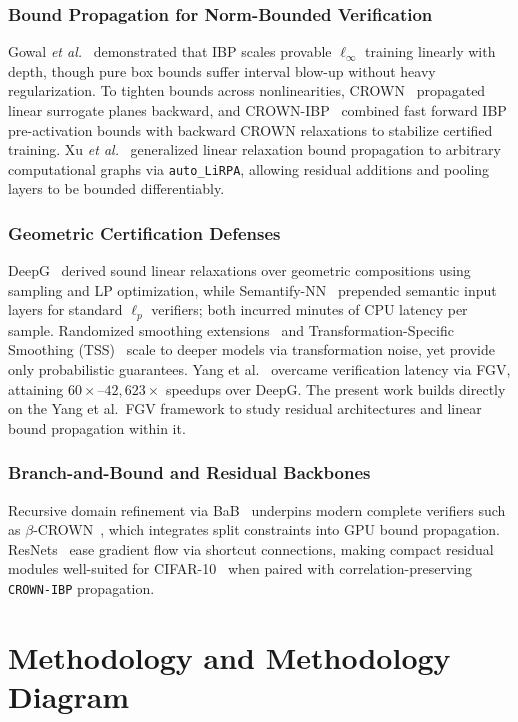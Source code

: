 \documentclass[conference]{IEEEtran}
\begin{document}
\subsubsection{Bound Propagation for Norm-Bounded Verification}
Gowal \textit{et al.}~\cite{b8} demonstrated that IBP scales provable
$\ell_\infty$ training linearly with depth, though pure box bounds suffer
interval blow-up without heavy regularization.
To tighten bounds across nonlinearities, CROWN~\cite{b9} propagated linear
surrogate planes backward, and CROWN-IBP~\cite{b10} combined fast forward
IBP pre-activation bounds with backward CROWN relaxations to stabilize
certified training.
Xu \textit{et al.}~\cite{b11} generalized linear relaxation bound propagation
to arbitrary computational graphs via \texttt{auto\_LiRPA}, allowing residual
additions and pooling layers to be bounded differentiably.

\subsubsection{Geometric Certification Defenses}
DeepG~\cite{b4} derived sound linear relaxations over geometric compositions
using sampling and LP optimization, while Semantify-NN~\cite{b5} prepended
semantic input layers for standard $\ell_p$ verifiers; both incurred minutes
of CPU latency per sample.
Randomized smoothing extensions~\cite{b6} and Transformation-Specific
Smoothing (TSS)~\cite{b7} scale to deeper models via transformation noise,
yet provide only probabilistic guarantees.
Yang et al.~\cite{b3} overcame verification latency via FGV, attaining
$60{\times}$--$42{,}623{\times}$ speedups over DeepG.
The present work builds directly on the Yang et al.\ FGV framework to study
residual architectures and linear bound propagation within it.

\subsubsection{Branch-and-Bound and Residual Backbones}
Recursive domain refinement via BaB~\cite{b12} underpins modern complete
verifiers such as $\beta$-CROWN~\cite{b13}, which integrates split constraints
into GPU bound propagation.
ResNets~\cite{b14} ease gradient flow via shortcut connections, making compact
residual modules well-suited for CIFAR-10~\cite{b16} when paired with
correlation-preserving \texttt{CROWN-IBP} propagation.

\section{Methodology and Methodology Diagram}
\end{document}

